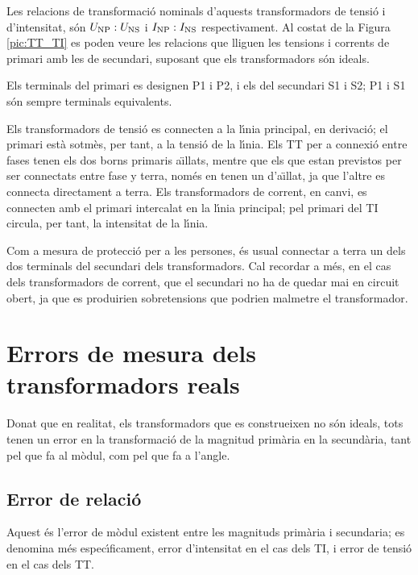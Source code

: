 Les relacions de transformaci\'{o} nominals d'aquests transformadors de
tensi\'{o} i d'intensitat, s\'{o}n $U_\mathrm{NP}:U_\mathrm{NS}$ i
$I_\mathrm{NP}:I_\mathrm{NS}$ respectivament. Al costat de la Figura
\vref{pic:TT_TI} es poden veure les relacions que lliguen les
tensions i corrents de primari amb les de secundari, suposant que
els transformadors s\'{o}n ideals.

Els terminals del primari es designen \textsf{P1} i \textsf{P2}, i
els del secundari \textsf{S1} i \textsf{S2}; \textsf{P1} i
\textsf{S1} s\'{o}n sempre terminals equivalents.

Els transformadors de tensi\'{o} es connecten a la l\'{\i}nia principal, en
derivaci\'{o}; el  primari est\`{a} sotm\`{e}s, per tant, a la tensi\'{o} de la
l\'{\i}nia. Els TT per a connexi\'{o} entre fases tenen els dos borns
primaris a\"{\i}llats, mentre que els que estan previstos per ser
connectats entre fase y terra, nom\'{e}s en tenen un d'a\"{\i}llat, ja que
l'altre es connecta directament a terra. Els transformadors de
corrent, en canvi, es connecten amb el primari intercalat en la
l\'{\i}nia principal;  pel primari del TI circula, per tant, la
intensitat de la l\'{\i}nia.

 Com a mesura de protecci\'{o} per a les persones, \'{e}s usual
connectar a terra un dels dos terminals del secundari dels
transformadors. Cal recordar a m\'{e}s, en el cas dels transformadors de
corrent, que el secundari no ha de quedar mai en circuit obert, ja
que es produirien sobretensions que podrien malmetre el
transformador.

\section{Errors de mesura dels transformadors reals}

Donat que en realitat, els transformadors que es construeixen no s\'{o}n
ideals, tots tenen un error en la transformaci\'{o} de la magnitud
prim\`{a}ria en la secund\`{a}ria, tant pel que fa al m\`{o}dul, com pel que fa
a l'angle.

\subsection{Error de relaci\'{o}}

Aquest \'{e}s l'error de m\`{o}dul existent entre les magnituds prim\`{a}ria i
secundaria; es denomina m\'{e}s espec\'{\i}ficament, error d'intensitat en el
cas dels TI, i error de tensi\'{o} en el cas dels TT.

